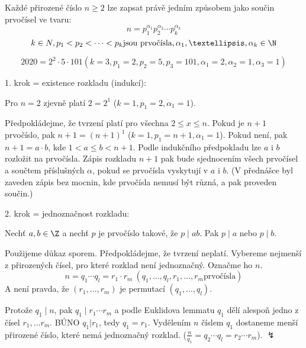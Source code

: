 \documentclass[12pt]{article}					%
\begin{document}
    \begin{veta}
        Každé přirozené číslo $n≥2$ lze zapsat právě jedním způsobem jako součin prvočísel ve tvaru:
        $$ n = p_1^{\alpha_1}p_2^{\alpha_2}\cdots p_k^{\alpha_k} $$ 
        $$ k \in N, p_1<p_2<\cdots<p_k \text{jsou prvočísla}, \alpha_1,…,\alpha_k \in \N$$
        \begin{prikladyin}
                $$ 2020 = 2^2 \cdot 5 \cdot 101 (k = 3, p_1 = 2, p_2 = 5, p_3 = 101, \alpha_1 = 2, \alpha_2 = 1, \alpha_3 = 1) $$ 
        \end{prikladyin}
        \begin{dukazin}
            1. krok = existence rozkladu (indukcí):
            
            Pro $n = 2$ zjevně platí $2 = 2^1$ ($k = 1, p_1 = 2, \alpha_1 = 1$).

            Předpokládejme, že tvrzení platí pro všechna $2≤x≤n$. Pokud je $n+1$ prvočíslo, pak $n+1 = (n+1)^1$ ($ k = 1, p_1 = n+1, \alpha_1 = 1$). Pokud není, pak $n+1 = a\cdot b$, kde $1 < a ≤ b < n+1$. Podle indukčního předpokladu lze $a$ i $b$ rozložit na prvočísla. Zápis rozkladu $n+1$ pak bude sjednocením všech prvočísel a součtem příslušných $\alpha$, pokud se prvočísla vyskytují v $a$ i $b$. (V přednášce byl zaveden zápis bez mocnin, kde prvočísla nemusí být různá, a pak proveden součin.)

            2. krok = jednoznačnost rozkladu:

            \begin{lemmain}
                Nechť $a, b \in \Z$ a nechť $p$ je prvočíslo takové, že $p\mid ab$. Pak $p\mid a$ nebo $p\mid b$.
            \end{lemmain}

            Použijeme důkaz sporem. Předpokládejme, že tvrzení neplatí. Vybereme nejmenší z přirozených čísel, pro které rozklad není jednoznačný. Označme ho $n$.
            $$ n = q_1\cdots q_l = r_1 \cdot r_m\ (q_1,…,q_l,r_1,…,r_m \text{prvočísla}) $$
            A není pravda, že $(r_1,…,r_m)$ je permutací $(q_1,…,q_l)$.

            Protože $q_1\mid n$, pak $q_1 \mid r_1 \cdots r_m$ a podle Euklidova lemmatu $q_1$ dělí alespoň jedno z čísel $r_1,…r_m$. BÚNO $q_1 | r_1$, tedy $q_1 = r_1$. Vydělením $n$ číslem $q_1$ dostaneme menší přirozené číslo, které nemá jednoznačný rozklad. ($\frac{n}{q_1} = q_2\cdots q_l = r_2 \cdots r_m$). $\lightning$
        \end{dukazin}
    \end{veta}
\end{document}
